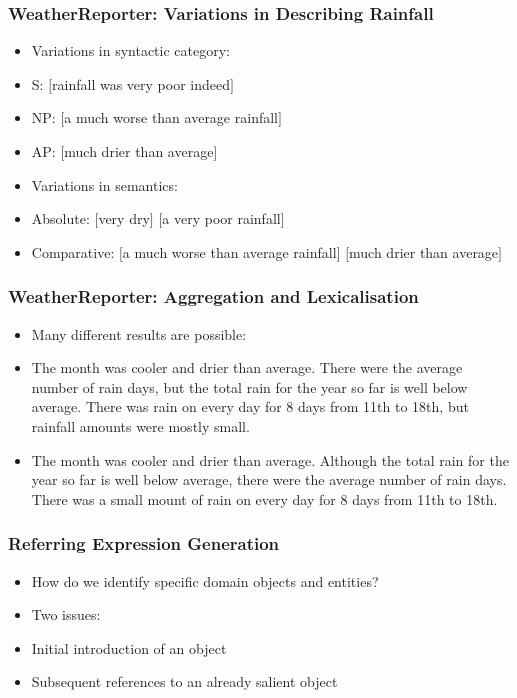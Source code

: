 \documentclass[compress,color=usenames]{beamer}
\begin{document}
\begin{frame}
\frametitle{
WeatherReporter: Variations in Describing Rainfall}

\label{f3}
\begin{itemize}
\item {{Variations in syntactic category:}}
\item {{S:                \mbox{$[$}rainfall was very poor indeed\mbox{$]$}}}
\item {{NP:        \mbox{$[$}a much worse than average rainfall\mbox{$]$}}}
\item {{AP:        \mbox{$[$}much drier than average\mbox{$]$}}}
\item {{Variations in semantics:}}
\item {{Absolute:        \mbox{$[$}very dry\mbox{$]$}
                \mbox{$[$}a very poor rainfall\mbox{$]$}}}
\item {{Comparative:        \mbox{$[$}a much worse than average rainfall\mbox{$]$}
                \mbox{$[$}much drier than average\mbox{$]$} }}
\end{itemize}
\end{frame}

\begin{frame}
\frametitle{
WeatherReporter: 
Aggregation and Lexicalisation}

\label{f7}
\begin{itemize}
\item {{Many different results are possible:}}
\item {{The month was cooler and drier than average.
There were the average number of rain days, but the total rain for the year so far is well below average. There was rain on every day for 8 days from 11th to 18th, but rainfall amounts were mostly small.}}
\item {{The month was cooler and drier than average.
Although the total rain for the year so far is well below average, there were the average number of rain days.  There was a small mount of rain on every day for 8 days from 11th to 18th.}}
\end{itemize}
\end{frame}

\begin{frame}
\frametitle{
Referring Expression Generation}

\label{f9}
\begin{itemize}
\item {{How do we identify specific domain objects and entities?}}
\item {{Two issues:}}
\item {{Initial introduction of an object}}
\item {{Subsequent references to an already salient object}}
\end{itemize}
\end{frame}
\end{document}
